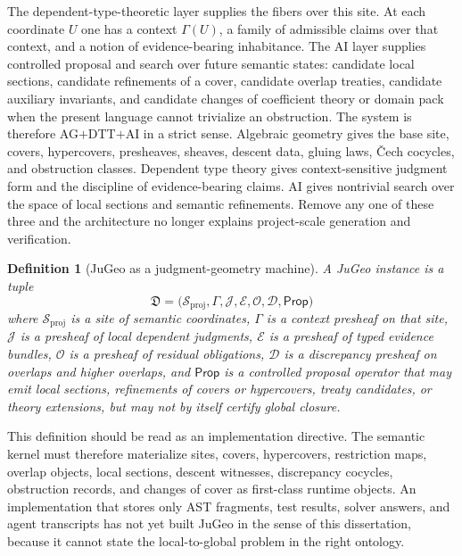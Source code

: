 \documentclass[11pt]{report}
\newtheorem{definition}{Definition}[chapter]
\begin{document}
The dependent-type-theoretic layer supplies the fibers over this site. At each coordinate $U$ one has a context $\Gamma(U)$, a family of admissible claims over that context, and a notion of evidence-bearing inhabitance. The AI layer supplies controlled proposal and search over future semantic states: candidate local sections, candidate refinements of a cover, candidate overlap treaties, candidate auxiliary invariants, and candidate changes of coefficient theory or domain pack when the present language cannot trivialize an obstruction. The system is therefore AG$+$DTT$+$AI in a strict sense. Algebraic geometry gives the base site, covers, hypercovers, presheaves, sheaves, descent data, gluing laws, \v{C}ech cocycles, and obstruction classes. Dependent type theory gives context-sensitive judgment form and the discipline of evidence-bearing claims. AI gives nontrivial search over the space of local sections and semantic refinements. Remove any one of these three and the architecture no longer explains project-scale generation and verification.

\begin{definition}[JuGeo as a judgment-geometry machine]
A JuGeo instance is a tuple
\[
\mathfrak{D}
=
\bigl(
\mathcal{S}_{\mathrm{proj}},
\Gamma,
\mathscr{J},
\mathscr{E},
\mathscr{O},
\mathscr{D},
\mathsf{Prop}
\bigr)
\]
where $\mathcal{S}_{\mathrm{proj}}$ is a site of semantic coordinates, $\Gamma$ is a context presheaf on that site, $\mathscr{J}$ is a presheaf of local dependent judgments, $\mathscr{E}$ is a presheaf of typed evidence bundles, $\mathscr{O}$ is a presheaf of residual obligations, $\mathscr{D}$ is a discrepancy presheaf on overlaps and higher overlaps, and $\mathsf{Prop}$ is a controlled proposal operator that may emit local sections, refinements of covers or hypercovers, treaty candidates, or theory extensions, but may not by itself certify global closure.
\end{definition}

This definition should be read as an implementation directive. The semantic kernel must therefore materialize sites, covers, hypercovers, restriction maps, overlap objects, local sections, descent witnesses, discrepancy cocycles, obstruction records, and changes of cover as first-class runtime objects. An implementation that stores only AST fragments, test results, solver answers, and agent transcripts has not yet built JuGeo in the sense of this dissertation, because it cannot state the local-to-global problem in the right ontology.
\end{document}
